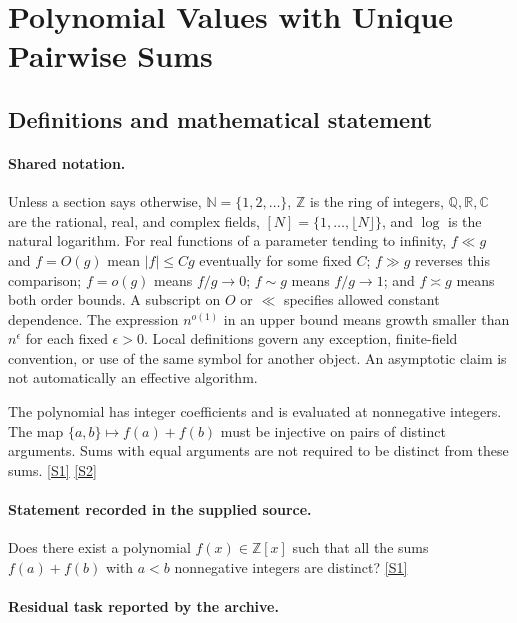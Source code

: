\documentclass[11pt,a4paper]{article}
\newcommand{\N}{\mathbb{N}}
\newcommand{\Z}{\mathbb{Z}}
\newcommand{\Q}{\mathbb{Q}}
\newcommand{\R}{\mathbb{R}}
\newcommand{\C}{\mathbb{C}}
\newcommand{\sref}[2]{\hyperlink{source:#1:#2}{[S#2]}}
\begin{document}
\section{Polynomial Values with Unique Pairwise Sums}\label{statement}


\subsection{Definitions and mathematical statement}

\paragraph{Shared notation.}Unless a section says otherwise, $\N=\{1,2,\ldots\}$,
$\Z$ is the ring of integers, $\Q,\R,\C$ are the rational, real, and complex
fields, $[N]=\{1,\ldots,\lfloor N\rfloor\}$, and $\log$ is the natural
logarithm. For real functions of a parameter tending to infinity,
$f\ll g$ and $f=O(g)$ mean $|f|\leq Cg$ eventually for some fixed $C$;
$f\gg g$ reverses this comparison; $f=o(g)$ means $f/g\to0$;
$f\sim g$ means $f/g\to1$; and $f\asymp g$ means both order bounds.
A subscript on $O$ or $\ll$ specifies allowed constant dependence.
The expression $n^{o(1)}$ in an upper bound means growth smaller than
$n^\epsilon$ for each fixed $\epsilon>0$. Local definitions govern any
exception, finite-field convention, or use of the same symbol for another
object. An asymptotic claim is not automatically an effective algorithm.



The polynomial has integer coefficients and is evaluated at nonnegative integers. The map $\{a,b\}\mapsto f(a)+f(b)$ must be injective on pairs of distinct arguments. Sums with equal arguments are not required to be distinct from these sums. \sref{statement}{1} \sref{statement}{2}

\paragraph{Statement recorded in the supplied source.}
Does there exist a polynomial $f(x)\in\mathbb{Z}[x]$ such that all the sums $f(a)+f(b)$ with $a<b$ nonnegative integers are distinct? \sref{statement}{1}

\paragraph{Residual task reported by the archive.}
\end{document}
